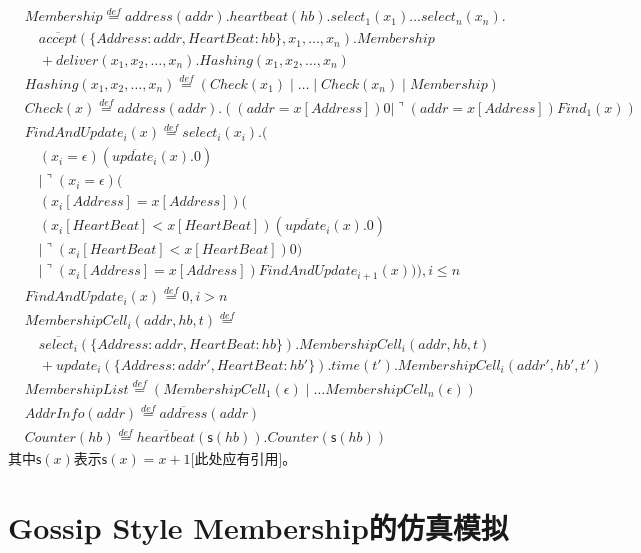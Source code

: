 \begin{align*}
    &Membership\stackrel{def}{=}address(addr).heartbeat(hb).select_1(x_1)\dots select_n(x_n).\\
    &\quad\overline{accept}(\{Address:addr,HeartBeat:hb\},x_1,\dots,x_n).Membership\\
    &\quad+deliver(x_1,x_2,\dots,x_n).Hashing(x_1,x_2,\dots,x_n)\\
    &Hashing(x_1,x_2,\dots,x_n)\stackrel{def}{=}(Check(x_1)\mid  \dots \mid Check(x_n) \mid Membership)\\
    &Check(x)\stackrel{def}{=}address(addr).((addr=x[Address])0|\urcorner(addr=x[Address])Find_1(x))\\
    &FindAndUpdate_i(x)\stackrel{def}{=}select_i(x_i).(\\
    &\quad(x_i = \epsilon) (\overline{update_i}(x).0)\\
    &\quad| \urcorner(x_i = \epsilon)(\\
    &\quad(x_i[Address]=x[Address])(\\
    &\quad(x_i[HeartBeat]<x[HeartBeat])(\overline{update_i}(x).0)\\
    &\quad\mid \urcorner (x_i[HeartBeat]<x[HeartBeat])0)\\
    &\quad\mid \urcorner (x_i[Address]=x[Address])FindAndUpdate_{i+1}(x))),i\leq n\\
    &FindAndUpdate_i(x)\stackrel{def}{=}0,i>n
   \end{align*}
   \begin{align*}
    &MembershipCell_i(addr,hb,t)\stackrel{def}{=}\\
    &\quad\overline{select_i}(\{Address:addr,HeartBeat:hb\}).MembershipCell_i(addr,hb,t)\\
    &\quad+update_i(\{Address:addr',HeartBeat:hb'\}).time(t').MembershipCell_i(addr',hb',t')\\
    &MembershipList\stackrel{def}{=}(MembershipCell_1(\epsilon)\mid \dots MembershipCell_n(\epsilon))\\
    &AddrInfo(addr)\stackrel{def}{=}\overline{address}(addr)\\
    &Counter(hb)\stackrel{def}{=}\overline{heartbeat}(\mathsf{s}(hb)).Counter(\mathsf{s}(hb))
\end{align*}
其中$\mathsf{s}(x)$表示$\mathsf{s}(x)=x+1$[此处应有引用]。
\section{Gossip Style Membership的仿真模拟}